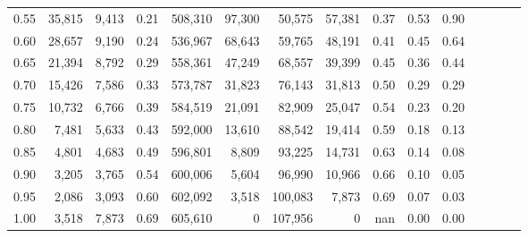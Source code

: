 \begin{tabular}{rrrcrrrrrrrrrrr}
0.55 &  35,815 &  9,413 &                                       0.21 &  508,310 &   97,300 &   50,575 &   57,381 &  0.37 &  0.53 &                         0.90 \\
0.60 &  28,657 &  9,190 &                                       0.24 &  536,967 &   68,643 &   59,765 &   48,191 &  0.41 &  0.45 &                         0.64 \\
0.65 &  21,394 &  8,792 &                                       0.29 &  558,361 &   47,249 &   68,557 &   39,399 &  0.45 &  0.36 &                         0.44 \\
0.70 &  15,426 &  7,586 &                                       0.33 &  573,787 &   31,823 &   76,143 &   31,813 &  0.50 &  0.29 &                         0.29 \\
0.75 &  10,732 &  6,766 &                                       0.39 &  584,519 &   21,091 &   82,909 &   25,047 &  0.54 &  0.23 &                         0.20 \\
0.80 &   7,481 &  5,633 &                                       0.43 &  592,000 &   13,610 &   88,542 &   19,414 &  0.59 &  0.18 &                         0.13 \\
0.85 &   4,801 &  4,683 &                                       0.49 &  596,801 &    8,809 &   93,225 &   14,731 &  0.63 &  0.14 &                         0.08 \\
0.90 &   3,205 &  3,765 &                                       0.54 &  600,006 &    5,604 &   96,990 &   10,966 &  0.66 &  0.10 &                         0.05 \\
0.95 &   2,086 &  3,093 &                                       0.60 &  602,092 &    3,518 &  100,083 &    7,873 &  0.69 &  0.07 &                         0.03 \\
1.00 &   3,518 &  7,873 &                                       0.69 &  605,610 &        0 &  107,956 &        0 &   nan &  0.00 &                         0.00 \\
\bottomrule
\end{tabular}
